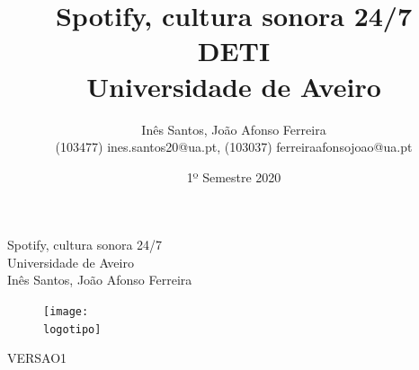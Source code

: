 \documentclass{report}
\begin{document}
%
\def\titulo{Spotify, cultura sonora 24/7}
\def\data{1º Semestre 2020}
\def\autores{Inês Santos, João Afonso Ferreira}
\def\autorescontactos{(103477) ines.santos20@ua.pt, (103037) ferreiraafonsojoao@ua.pt}
\def\versao{VERSAO}
\def\departamento{DETI}
\def\empresa{Universidade de Aveiro}
\def\logotipo{Imagens/ua.pdf}
%
%
\renewcommand{\contentsname}{Índice}
\begin{titlepage}

\begin{center}
%
\vspace*{50mm}
%
{\Huge \titulo}\\ 
%
\vspace{10mm}
%
{\Large \empresa}\\
%
\vspace{10mm}
%
{\LARGE \autores}\\ 
%
\vspace{30mm}
%
\begin{figure}
\center
\texttt{[image: \\logotipo]}
\end{figure}
%
\vspace{30mm}
\end{center}
%
\begin{flushright}
\versao 1
\end{flushright}
\end{titlepage}

\title{%
{\Huge\textbf{\titulo}}\\
{\Large \departamento\\ \empresa}
}
%
\author{%
    \autores \\
    \autorescontactos
}
%
\date{\data}
%
\maketitle
%
%
\tableofcontents %
\listoffigures %
\listoftables %
\end{document}
